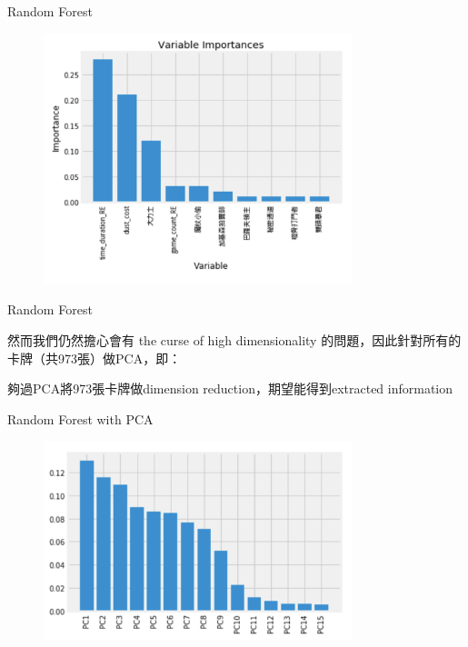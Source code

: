 \documentclass[12pt]{beamer}
\begin{document}
\begin{frame}[fragile]{Random Forest}

	\begin{figure}
		\begin{center}
			\includegraphics[width=0.8\textwidth]{figure/plot/1a_importance.png}
		\end{center}
	\end{figure}

\end{frame}

\begin{frame}[fragile]{Random Forest}

然而我們仍然擔心會有 the curse of high dimensionality 的問題，因此針對所有的卡牌（共973張）做PCA，即：

夠過PCA將973張卡牌做dimension reduction，期望能得到extracted information


\end{frame}


\begin{frame}[fragile]{Random Forest with PCA}

	\begin{figure}
		\begin{center}
			\includegraphics[width=0.8\textwidth]{figure/plot/2b.png}
		\end{center}
	\end{figure}

\end{frame}
\end{document}

